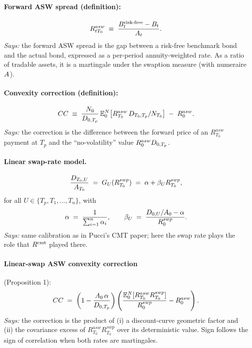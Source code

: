 \documentclass[11pt,a4paper]{article}
\begin{document}
\paragraph{Forward ASW spread (definition):}
\begin{equation}\label{eq:cmasw-asw-def}
  R^{asw}_{t T_0} \;\equiv\; \frac{B^{\text{risk-free}}_t - B_t}{A_{t}}.
\end{equation}
\textit{Says:} the forward ASW spread is the gap between a risk-free
benchmark bond and the actual bond, expressed as a per-period
annuity-weighted rate. As a ratio of tradable assets, it is a
martingale under the swaption measure (with numeraire $A_{}$).

\paragraph{Convexity correction (definition):}
\begin{equation}\label{eq:cmasw-cc-def}
  CC \;\equiv\; \frac{N_{0}}{D_{0,T_p}}\, \mathbb{E}^N_0\!\left[ R^{asw}_{T_0}\, D_{T_0,T_p} / N_{T_0} \right] \;-\; R^{asw}_0.
\end{equation}
\textit{Says:} the correction is the difference between the forward
price of an $R^{asw}_{T_0}$ payment at $T_p$ and the
``no-volatility'' value $R^{asw}_0 D_{0,T_p}$.

\paragraph{Linear swap-rate model.}
\begin{equation}\label{eq:cmasw-linearG}
  \frac{D_{T_0,U}}{A_{T_0}} \;=\; G_U(R^{swp}_{T_0}) \;=\; \alpha + \beta_U R^{swp}_{T_0},
\end{equation}
for all $U \in \{T_p, T_1, \ldots, T_n\}$, with
\begin{equation}\label{eq:cmasw-calib}
  \alpha \;=\; \frac{1}{\sum_{i=1}^n \alpha_i}, \qquad
  \beta_U \;=\; \frac{D_{0,U}/A_{0} - \alpha}{R^{swp}_0}.
\end{equation}
\textit{Says:} same calibration as in Pucci's CMT paper; here the
swap rate plays the role that $R^{\mathrm{cmt}}$ played there.

\paragraph{Linear-swap ASW convexity correction} (Proposition 1):
\begin{equation}\label{eq:cmasw-cc-prop}
  CC \;=\; \left(1 - \frac{A_{0}\, \alpha}{D_{0,T_p}}\right) \left( \frac{\mathbb{E}^N_0[R^{asw}_{T_0} R^{swp}_{T_0}]}{R^{swp}_0} - R^{asw}_0 \right).
\end{equation}
\textit{Says:} the correction is the product of (i) a discount-curve
geometric factor and (ii) the covariance excess of
$R^{asw}_{T_0} R^{swp}_{T_0}$ over its deterministic value. Sign
follows the sign of correlation when both rates are martingales.
\end{document}
